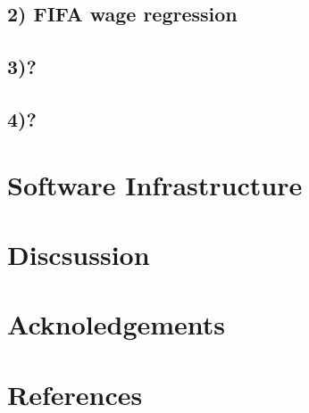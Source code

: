 \documentclass[
]{article}
\begin{document}
\hypertarget{fifa-wage-regression}{%
\subsection{2) FIFA wage regression}\label{fifa-wage-regression}}

\hypertarget{section}{%
\subsection{3)?}\label{section}}

\hypertarget{section-1}{%
\subsection{4)?}\label{section-1}}

\hypertarget{software-infrastructure}{%
\section{Software Infrastructure}\label{software-infrastructure}}

\hypertarget{discsussion}{%
\section{Discsussion}\label{discsussion}}

\hypertarget{acknoledgements}{%
\section{Acknoledgements}\label{acknoledgements}}

\hypertarget{references}{%
\section{References}\label{references}}
\end{document}
